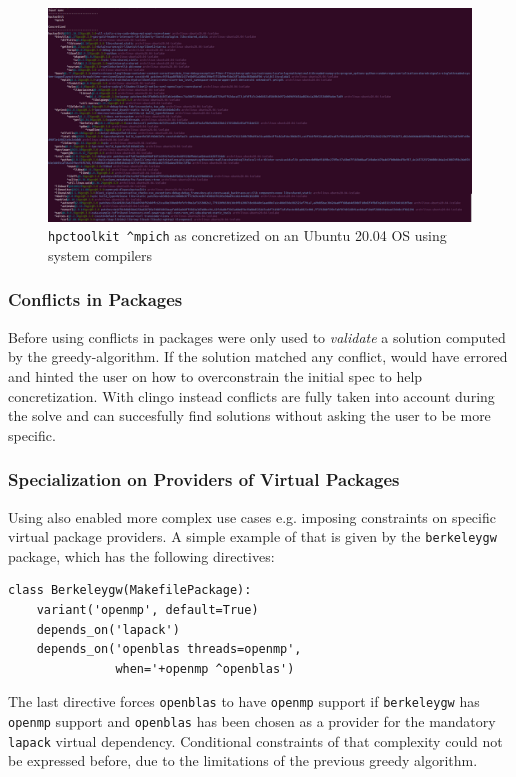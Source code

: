 \begin{figure}[h]
\includegraphics[width=\columnwidth]{figures/hpctoolkit_concretized.png}
\caption{\texttt{hpctoolkit \^{}mpich} as concretized on an Ubuntu 20.04 OS using system compilers}
\label{fig:hpctoolkit}
\end{figure}

\subsubsection{Conflicts in Packages}
Before using \clingo{} conflicts in packages were only used to \emph{validate} a solution computed by the greedy-algorithm. If the solution matched any conflict, \spack{} would have errored and hinted the user on how to overconstrain the initial spec to help concretization. With clingo instead conflicts are fully taken into account during the solve\footnotemark{} and \spack{} can succesfully find solutions without asking the user to be more specific.

\subsubsection{Specialization on Providers of Virtual Packages}
Using \clingo{} also enabled more complex use cases e.g. imposing constraints on specific virtual package providers. A simple example of that is given by the \texttt{berkeleygw} package, which has the following directives:
\begin{verbatim}
class Berkeleygw(MakefilePackage):
    variant('openmp', default=True)
    depends_on('lapack')
    depends_on('openblas threads=openmp', 
               when='+openmp ^openblas')
\end{verbatim}
The last directive forces \texttt{openblas} to have \texttt{openmp} support if \texttt{berkeleygw} has \texttt{openmp} support and \texttt{openblas} has been chosen as a provider for the mandatory \texttt{lapack} virtual dependency. Conditional constraints of that complexity could not be expressed before, due to the limitations of the previous greedy algorithm.
